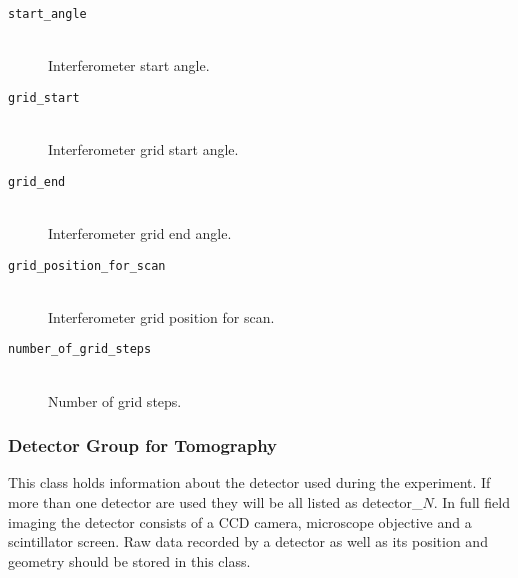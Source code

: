 \begin{description}
\item[\tt{start\_angle}] \hfill \\
{Interferometer start angle.}

\item[\tt{grid\_start}] \hfill \\
{Interferometer grid start angle.}

\item[\tt{grid\_end}] \hfill \\
{Interferometer grid end angle.}

\item[\tt{grid\_position\_for\_scan}] \hfill \\
{Interferometer grid position for scan.}   

\item[\tt{number\_of\_grid\_steps}] \hfill \\
{Number of grid steps.}
\end{description}

\subsubsection{Detector Group for Tomography}
\label{table:tomo:detector}

This class holds information about the detector used during the experiment. If  more than one detector are used they will be all listed as detector\_$N$. In full field imaging the detector consists of a CCD camera, microscope objective and a scintillator screen. Raw data recorded by a detector as well as its position and geometry should be stored in this class. 


